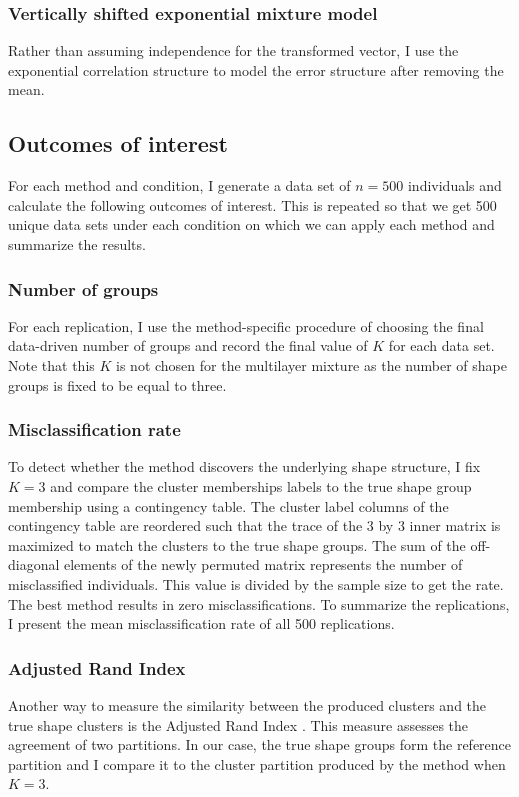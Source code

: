 \subsubsection{Vertically shifted exponential mixture model}
Rather than assuming independence for the transformed vector, I use the exponential correlation structure to model the error structure after removing the mean.

\subsection{Outcomes of interest}
For each method and condition, I generate a data set of $n=500$ individuals and calculate the following outcomes of interest. This is repeated so that we get 500 unique data sets under each condition on which we can apply each method and summarize the results.

\subsubsection{Number of groups}
For each replication, I use the method-specific procedure of choosing the final data-driven number of groups and record the final value of $K$ for each data set. Note that this $K$ is not chosen for the multilayer mixture as the number of shape groups is fixed to be equal to three.

\subsubsection{Misclassification rate}
To detect whether the method discovers the underlying shape structure, I fix $K=3$ and compare the cluster memberships labels to the true shape group membership using a contingency table. The cluster label columns of the contingency table are reordered such that the trace of the 3 by 3 inner matrix is maximized to match the clusters to the true shape groups. The sum of the off-diagonal elements of the newly permuted matrix represents the number of misclassified individuals. This value is divided by the sample size to get the rate. The best method results in zero misclassifications. To summarize the replications, I present the mean misclassification rate of all 500 replications.

\subsubsection{Adjusted Rand Index}
Another way to measure the similarity between the produced clusters and the true shape clusters is the Adjusted Rand Index \cite{hubert1985,mulligan1985}. This measure assesses the agreement of two partitions. In our case, the true shape groups form the reference partition and I compare it to the cluster partition produced by the method when $K=3$.
 

